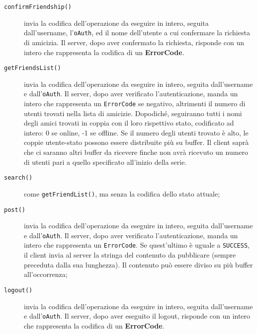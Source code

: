 \documentclass[11pt]{article}
\begin{document}
\begin{description}
	\item[{\tt confirmFriendship()}] invia la codifica dell'operazione da
	eseguire in intero, seguita dall'username, l'{\tt oAuth}, ed il nome
	dell'utente a cui confermare la richiesta di amicizia. Il server, dopo aver
	confermato la  richiesta, risponde con un intero che rappresenta la codifica
	di un {\bf ErrorCode}.
	\item[{\tt getFriendsList()}] invia la codifica dell'operazione da eseguire
	in intero, seguita dall'username e dall'{\tt oAuth}. Il server, dopo aver
	verificato l'autenticazione, manda un intero che rappresenta un
	{\tt ErrorCode} se negativo, altrimenti il numero di utenti trovati nella
	lista di amicizie. Dopodiché, seguiranno tutti i nomi degli amici trovati in
	coppia con il loro rispettivo stato, codificato ad intero: 0 se online, -1
	se offline. Se il numero degli utenti trovato è alto, le coppie utente-stato
	possono essere distribuite più su buffer. Il client saprà che ci saranno
	altri buffer da ricevere finche non avrà ricevuto un numero di utenti pari
	a quello specificato all'inizio della serie.
	\item[{\tt search()}] come {\tt getFriendList()}, ma senza la codifica dello
	stato attuale;
	\item[{\tt post()}] invia la codifica dell'operazione da eseguire in intero,
	seguita dall'username e dall'{\tt oAuth}. Il server, dopo aver verificato
	l'autenticazione, manda un intero che rappresenta un {\tt ErrorCode}. Se
	quest'ultimo è uguale a {\tt SUCCESS}, il client invia al server la stringa
	del contenuto da pubblicare (sempre preceduta dalla sua lunghezza). Il
	contenuto può essere diviso su più buffer all'occorrenza;
	\item[{\tt logout()}] invia la codifica dell'operazione da eseguire in
	intero, seguita dall'username e dall'{\tt oAuth}. Il server, dopo aver
	eseguito il logout, risponde con un intero che rappresenta la codifica di un
	{\bf ErrorCode}.
\end{description}
\end{document}
